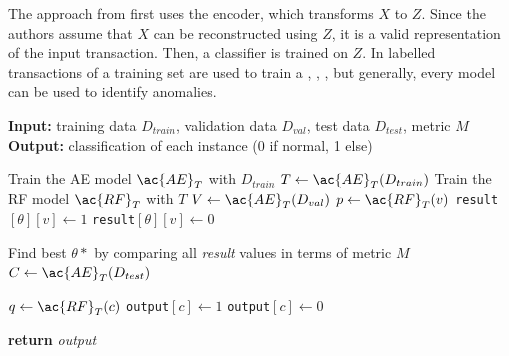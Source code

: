 The approach from \cite{cf_AE} first uses the encoder, which transforms $X$ to $Z$. Since the authors assume that $X$ can be reconstructed using $Z$, it is a valid representation of the input transaction.
Then, a classifier is trained on $Z$. In \cite{cf_AE} labelled transactions of a training set are used to train a , , , but generally, every model can be used to identify anomalies. 
%
\begin{algorithm}
\caption{}\label{alg:AE_PRF}
 \hspace*{\algorithmicindent} \textbf{Input:} training data $D_{train}$,  validation data $D_{val}$, test data $D_{test}$, metric $M$ \\
 \hspace*{\algorithmicindent} \textbf{Output:} classification of each instance (0 if normal, 1 else)

\begin{algorithmic}[1]
\State Train the \ac{AE} model $\ac{AE}_T$ with $D_{train}$
\State $T \gets \ac{AE}_T(D_{train})$
\State Train the \ac{RF} model $\ac{RF}_T$ with $T$
\State $V \gets \ac{AE}_T(D_{val})$
        \State $p \gets \ac{RF}_T(v)$
            \State \texttt{result}$[\theta][v] \gets 1$
        \Else
            \State \texttt{result}$[\theta][v] \gets 0$
        \EndIf 
    \EndFor
\EndFor

\State Find best $\theta*$ by comparing all \textit{result} values in terms of metric $M$
\State $C \gets \ac{AE}_T(D_{test})$

        \State $q \gets \ac{RF}_T(c)$
            \State \texttt{output}$[c] \gets 1$
        \Else
            \State \texttt{output}$[c] \gets 0$
        \EndIf 
    \EndFor

\State \textbf{return} \textit{output}
\end{algorithmic}
\end{algorithm}
%

